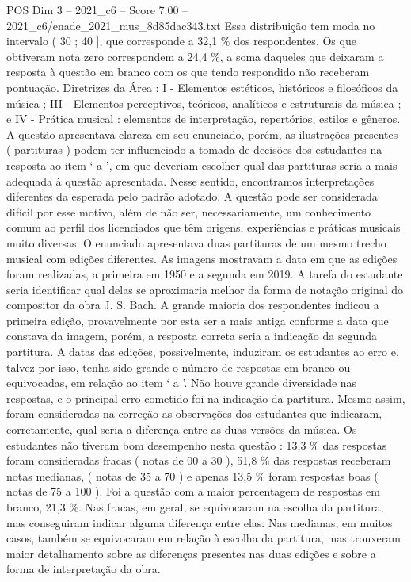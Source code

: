 \begin{textsample}{POS Dim 3 – 2021\_c6 – Score 7.00 – 2021\_c6/enade\_2021\_mus\_8d85dac343.txt}
Essa distribuição tem moda no intervalo ( 30 ; 40 ], que corresponde a 32,1 \% dos respondentes.
Os que obtiveram nota zero correspondem a 24,4 \%, a soma daqueles que deixaram a resposta à questão em branco com os que tendo respondido não receberam pontuação.
Diretrizes da Área : I - Elementos estéticos, históricos e filosóficos da música ; III - Elementos perceptivos, teóricos, analíticos e estruturais da música ; e IV - Prática musical : elementos de interpretação, repertórios, estilos e gêneros.
A questão apresentava clareza em seu enunciado, porém, as ilustrações presentes ( partituras ) podem ter influenciado a tomada de decisões dos estudantes na resposta ao item ‘ a ’, em que deveriam escolher qual das partituras seria a mais adequada à questão apresentada.
Nesse sentido, encontramos interpretações diferentes da esperada pelo padrão adotado.
A questão pode ser considerada difícil por esse motivo, além de não ser, necessariamente, um conhecimento comum ao perfil dos licenciados que têm origens, experiências e práticas musicais muito diversas.
O enunciado apresentava duas partituras de um mesmo trecho musical com edições diferentes.
As imagens mostravam a data em que as edições foram realizadas, a primeira em 1950 e a segunda em 2019.
A tarefa do estudante seria identificar qual delas se aproximaria melhor da forma de notação original do compositor da obra J.
S.
Bach.
A grande maioria dos respondentes indicou a primeira edição, provavelmente por esta ser a mais antiga conforme a data que constava da imagem, porém, a resposta correta seria a indicação da segunda partitura.
A datas das edições, possivelmente, induziram os estudantes ao erro e, talvez por isso, tenha sido grande o número de respostas em branco ou equivocadas, em relação ao item ‘ a ’.
Não houve grande diversidade nas respostas, e o principal erro cometido foi na indicação da partitura.
Mesmo assim, foram consideradas na correção as observações dos estudantes que indicaram, corretamente, qual seria a diferença entre as duas versões da música.
Os estudantes não tiveram bom desempenho nesta questão : 13,3 \% das respostas foram consideradas fracas ( notas de 00 a 30 ), 51,8 \% das respostas receberam notas medianas, ( notas de 35 a 70 ) e apenas 13,5 \% foram respostas boas ( notas de 75 a 100 ).
Foi a questão com a maior percentagem de respostas em branco, 21,3 \%.
Nas fracas, em geral, se equivocaram na escolha da partitura, mas conseguiram indicar alguma diferença entre elas.
Nas medianas, em muitos casos, também se equivocaram em relação à escolha da partitura, mas trouxeram maior detalhamento sobre as diferenças presentes nas duas edições e sobre a forma de interpretação da obra.

\end{textsample}
